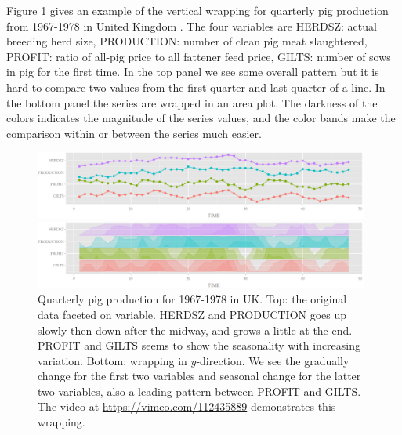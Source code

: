 \documentclass[12pt]{article}
\begin{document}
\begin{itemize}
\begin{center}
\par\end{center}


Figure \ref{fig:y-wrapping} gives an example of the vertical wrapping
for quarterly pig production from 1967-1978 in United Kingdom \citep{andrews1985data}.
The four variables are HERDSZ: actual breeding herd size, PRODUCTION:
number of clean pig meat slaughtered, PROFIT: ratio of all-pig price
to all fattener feed price, GILTS: number of sows in pig for the first
time. In the top panel we see some overall pattern but it is hard
to compare two values from the first quarter and last quarter of a
line. In the bottom panel the series are wrapped in an area plot.
The darkness of the colors indicates the magnitude of the series values,
and the color bands make the comparison within or between the series
much easier. 


\begin{center}
\begin{figure}[H]
\begin{centering}
\includegraphics[width=0.98\textwidth]{graph/pipeline-17-original-wp-l}
\par\end{centering}

\begin{centering}
\includegraphics[width=0.98\textwidth]{graph/pipeline-17-ywrap-w}
\par\end{centering}

\caption{\label{fig:y-wrapping}Quarterly pig production for 1967-1978 in UK.
Top: the original data faceted on variable. HERDSZ and PRODUCTION
goes up slowly then down after the midway, and grows a little at the
end. PROFIT and GILTS seems to show the seasonality with increasing
variation. Bottom: wrapping in $y$-direction. We see the gradually change
for the first two variables and seasonal change for the latter two
variables, also a leading pattern between PROFIT and GILTS. The video at \url{https://vimeo.com/112435889} demonstrates this wrapping.}
\end{figure}


\end{center}
\end{itemize}
\end{document}
